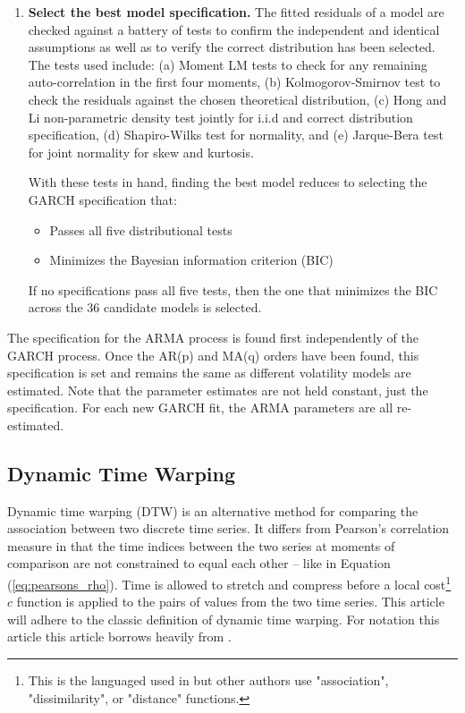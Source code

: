 \documentclass[12pt]{article}
\begin{document}
\begin{enumerate}
    \item \textbf{Select the best model specification.} The fitted residuals of a model are checked against a battery of tests to confirm the independent and identical assumptions as well as to verify the correct distribution has been selected. The tests used include: (a) Moment LM tests to check for any remaining auto-correlation in the first four moments, (b) Kolmogorov-Smirnov test to check the residuals against the chosen theoretical distribution, (c) Hong and Li \cite{HongLi2005} non-parametric density test jointly for i.i.d and correct distribution specification, (d) Shapiro-Wilks \cite{ShapiroWilks1965} test for normality, and (e) Jarque-Bera \cite{JarqueBera1980} test for joint normality for skew and kurtosis.
    
    With these tests in hand, finding the best model reduces to selecting the GARCH specification that:
    
    \begin{itemize}
        \item Passes all five distributional tests
        \item Minimizes the Bayesian information criterion (BIC)
    \end{itemize}

    If no specifications pass all five tests, then the one that minimizes the BIC across the 36 candidate models is selected.

\end{enumerate}

The specification for the ARMA process is found first independently of the GARCH process. Once the AR(p) and MA(q) orders have been found, this specification is set and remains the same as different volatility models are estimated. Note that the parameter estimates are not held constant, just the specification. For each new GARCH fit, the ARMA parameters are all re-estimated.


\subsection{Dynamic Time Warping} \label{sec:DTW}

Dynamic time warping (DTW) is an alternative method for comparing the association between two discrete time series. It differs from Pearson's correlation measure in that the time indices between the two series at moments of comparison are not constrained to equal each other -- like in Equation (\ref{eq:pearsons_rho}). Time is allowed to stretch and compress before a local cost\footnote{This is the languaged used in \cite{Mueller2007} but other authors use "association", "dissimilarity", or "distance" functions.} $c$ function is applied to the pairs of values from the two time series. This article will adhere to the classic definition of dynamic time warping. For notation this article this article borrows heavily from \cite{Mueller2007}.
\end{document}
